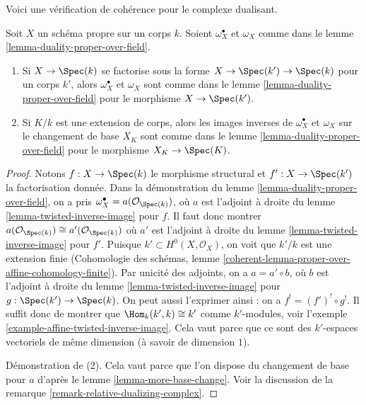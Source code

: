 \noindent
Voici une vérification de cohérence pour le complexe dualisant.

\begin{lemma}
\label{lemma-sanity-check-duality}
Soit $X$ un schéma propre sur un corps $k$. Soient $\omega_X^\bullet$ et $\omega_X$ comme dans le lemme \ref{lemma-duality-proper-over-field}.
\begin{enumerate}
\item Si $X \to \Spec(k)$ se factorise sous la forme $X \to \Spec(k') \to \Spec(k)$ pour un corps $k'$, alors $\omega_X^\bullet$ et $\omega_X$ sont comme dans le lemme \ref{lemma-duality-proper-over-field} pour le morphisme $X \to \Spec(k')$.
\item Si $K/k$ est une extension de corps, alors les images inverses de $\omega_X^\bullet$ et $\omega_X$ sur le changement de base $X_K$ sont comme dans le lemme \ref{lemma-duality-proper-over-field} pour le morphisme $X_K \to \Spec(K)$.
\end{enumerate}
\end{lemma}

\begin{proof}
Notons $f : X \to \Spec(k)$ le morphisme structural et $f' : X \to \Spec(k')$ la factorisation donnée. Dans la démonstration du lemme \ref{lemma-duality-proper-over-field}, on a pris $\omega_X^\bullet = a(\mathcal{O}_{\Spec(k)})$, où $a$ est l'adjoint à droite du lemme \ref{lemma-twisted-inverse-image} pour $f$. Il faut donc montrer
$a(\mathcal{O}_{\Spec(k)}) \cong a'(\mathcal{O}_{\Spec(k)})$
où $a'$ est l'adjoint à droite du lemme \ref{lemma-twisted-inverse-image} pour $f'$. Puisque $k' \subset H^0(X, \mathcal{O}_X)$, on voit que $k'/k$ est une extension finie (Cohomologie des schémas, lemme \ref{coherent-lemma-proper-over-affine-cohomology-finite}). Par unicité des adjoints, on a $a = a' \circ b$, où $b$ est l'adjoint à droite du lemme \ref{lemma-twisted-inverse-image} pour $g : \Spec(k') \to \Spec(k)$. On peut aussi l'exprimer ainsi : on a $f^! = (f')^! \circ g^!$. Il suffit donc de montrer que $\Hom_k(k', k) \cong k'$ comme $k'$-modules, voir l'exemple \ref{example-affine-twisted-inverse-image}. Cela vaut parce que ce sont des $k'$-espaces vectoriels de même dimension (à savoir de dimension $1$).

\medskip\noindent
Démonstration de (2). Cela vaut parce que l'on dispose du changement de base pour $a$ d'après le lemme \ref{lemma-more-base-change}. Voir la discussion de la remarque \ref{remark-relative-dualizing-complex}.
\end{proof}








